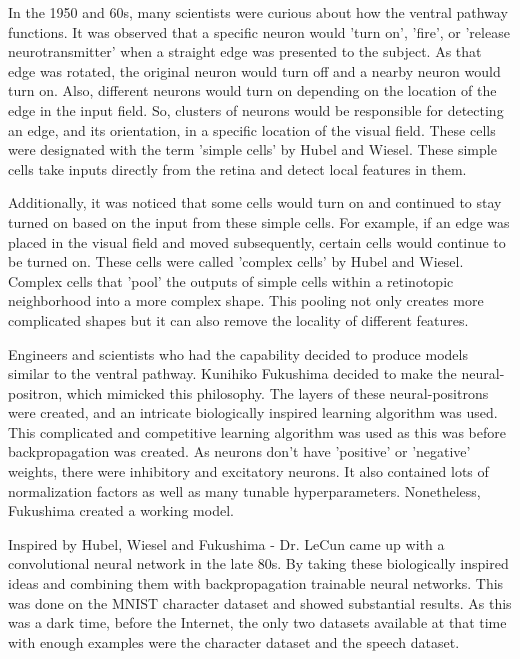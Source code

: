 In the 1950 and 60s, many scientists were curious about how the ventral pathway functions. It was observed that a specific neuron would 'turn on', 'fire', or 'release neurotransmitter' when a straight edge was presented to the subject. As that edge was rotated, the original neuron would turn off and a nearby neuron would turn on. Also, different neurons would turn on depending on the location of the edge in the input field. So, clusters of neurons would be responsible for detecting an edge, and its orientation, in a specific location of the visual field.
These cells were designated with the term 'simple cells' by Hubel and Wiesel. These simple cells take inputs directly from the retina and detect local features in them.

Additionally, it was noticed that some cells would turn on and continued to stay turned on based on the input from these simple cells. For example, if an edge was placed in the visual field and moved subsequently, certain cells would continue to be turned on. These cells were called 'complex cells' by Hubel and Wiesel. Complex cells that 'pool' the outputs of simple cells within a retinotopic neighborhood into a more complex shape. This pooling not only creates more complicated shapes but it can also remove the locality of different features.

Engineers and scientists who had the capability decided to produce models similar to the ventral pathway. Kunihiko Fukushima decided to make the neural-positron, which mimicked this philosophy. The layers of these neural-positrons were created, and an intricate biologically inspired learning algorithm was used. This complicated and competitive learning algorithm was used as this was before backpropagation was created. As neurons don't have 'positive' or 'negative' weights, there were inhibitory and excitatory neurons. It also contained lots of normalization factors as well as many tunable hyperparameters.
Nonetheless, Fukushima created a working model.

Inspired by Hubel, Wiesel and Fukushima - Dr. LeCun came up with a convolutional neural network in the late 80s. By taking these biologically inspired ideas and combining them with backpropagation trainable neural networks. This was done on the MNIST character dataset and showed substantial results. As this was a dark time, before the Internet, the only two datasets available at that time with enough examples were the character dataset and the speech dataset.

